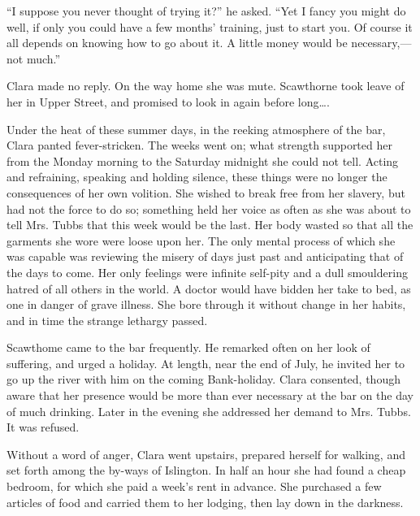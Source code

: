 ``I suppose you never thought of trying it?'' he asked. ``Yet I fancy
you might do well, if only you could have a few months' training, just
to start you. Of course it all depends on knowing how to go about it. A
little money would be necessary,---not much.''

{\protect\hypertarget{213}{}{}}Clara made no reply. On the way home she
was mute. Scawthorne took leave of her in Upper Street, and promised to
look in again before long\ldots{}.

Under the heat of these summer days, in the reeking atmosphere of the
bar, Clara panted fever-stricken. The weeks went on; what strength
supported her from the Monday morning to the Saturday midnight she could
not tell. Acting and refraining, speaking and holding silence, these
things were no longer the consequences of her own volition. She wished
to break free from her slavery, but had not the force to do so;
something held her voice as often as she was about to tell Mrs. Tubbs
that this week would be the last. Her body wasted so that all the
garments she wore were loose upon her. The only mental process of which
she was capable was reviewing the misery of days just past and
anticipating that of the days to come. Her only feelings were infinite
self-pity and a dull smouldering hatred of all others in the world. A
doctor would have bidden her take {\protect\hypertarget{214}{}{}}to bed,
as one in danger of grave illness. She bore through it without change in
her habits, and in time the strange lethargy passed.

Scawthome came to the bar frequently. He remarked often on her look of
suffering, and urged a holiday. At length, near the end of July, he
invited her to go up the river with him on the coming Bank-holiday.
Clara consented, though aware that her presence would be more than ever
necessary at the bar on the day of much drinking. Later in the evening
she addressed her demand to Mrs. Tubbs. It was refused.

Without a word of anger, Clara went upstairs, prepared herself for
walking, and set forth among the by-ways of Islington. In half an hour
she had found a cheap bedroom, for which she paid a week's rent in
advance. She purchased a few articles of food and carried them to her
lodging, then lay down in the darkness.
